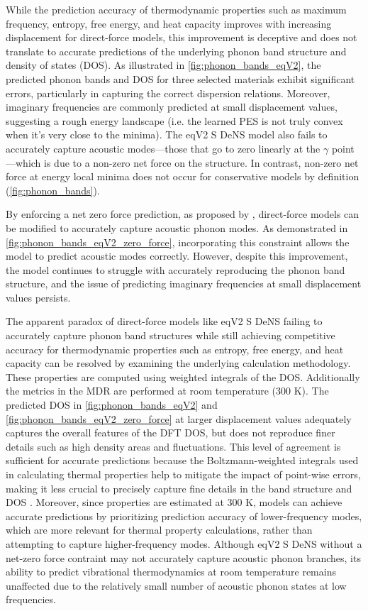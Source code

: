 \documentclass[twocolumn]{fairmeta}
\begin{document}
While the prediction accuracy of thermodynamic properties such as maximum frequency, entropy, free energy, and heat capacity improves with increasing displacement for direct-force models, this improvement is deceptive and does not translate to accurate predictions of the underlying phonon band structure and density of states (DOS). As illustrated in \cref{fig:phonon_bands_eqV2}, the predicted phonon bands and DOS for three selected materials exhibit significant errors, particularly in capturing the correct dispersion relations. Moreover, imaginary frequencies are commonly predicted at small displacement values, suggesting a rough energy landscape (i.e. the learned PES is not truly convex when it's very close to the minima). The eqV2 S DeNS model also fails to accurately capture acoustic modes---those that go to zero linearly at the $\gamma$ point---which is due to a non-zero net force on the structure. In contrast, non-zero net force at energy local minima does not occur for conservative models by definition (\cref{fig:phonon_bands}).

By enforcing a net zero force prediction, as proposed by \citealt{neumann2024orb}, direct-force models can be modified to accurately capture acoustic phonon modes. As demonstrated in \cref{fig:phonon_bands_eqV2_zero_force}, incorporating this constraint allows the model to predict acoustic modes correctly. However, despite this improvement, the model continues to struggle with accurately reproducing the phonon band structure, and the issue of predicting imaginary frequencies at small displacement values persists.

The apparent paradox of direct-force models like eqV2 S DeNS failing to accurately capture phonon band structures while still achieving competitive accuracy for thermodynamic properties such as entropy, free energy, and heat capacity can be resolved by examining the underlying calculation methodology. These properties are computed using weighted integrals of the DOS. Additionally the metrics in the MDR are performed at room temperature (300 K). The predicted DOS in \cref{fig:phonon_bands_eqV2} and \cref{fig:phonon_bands_eqV2_zero_force} at larger displacement values adequately captures the overall features of the DFT DOS, but does not reproduce finer details such as high density areas and fluctuations. This level of agreement is sufficient for accurate predictions because the Boltzmann-weighted integrals used in calculating thermal properties help to mitigate the impact of point-wise errors, making it less crucial to precisely capture fine details in the band structure and DOS \cite{ackland1997practical, vandewalle2002effect}. Moreover, since properties are estimated at 300 K, models can achieve accurate predictions by prioritizing prediction accuracy of lower-frequency modes, which are more relevant for thermal property calculations, rather than attempting to capture higher-frequency modes. Although eqV2 S DeNS without a net-zero force contraint may not accurately capture acoustic phonon branches, its ability to predict vibrational thermodynamics at room temperature remains unaffected due to the relatively small number of acoustic phonon states at low frequencies.
\end{document}
